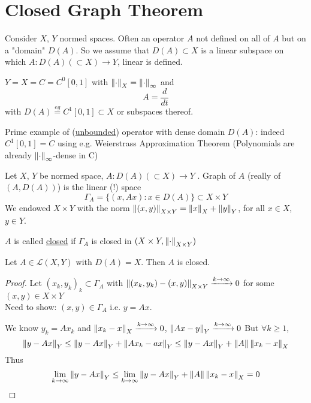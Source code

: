 \documentclass{article}
\begin{document}
\section{Closed Graph Theorem}
Consider $X$, $Y$ normed spaces. Often an operator $A$ not defined on all of $A$ but on a "domain" $D(A)$. So we assume that 
$D(A)\subset X$ is a linear subspace on which $A:D(A)(\subset X)\to Y$, linear is defined.
\begin{example}\nl
$Y=X=C=C^0[0,1]$ with $\left\|{\cdot}\right\|_X=\left\|{\cdot}\right\|_\infty$ and 
$$A=\frac{d}{dt}$$
with $D(A)\stackrel{eg}{=}C^1[0,1]\subset X$ or subspaces thereof. 

Prime example of  (\underline{unbounded}) operator with dense domain $D(A)$: indeed $C^1[0,1]=C$ using e.g. Weierstrass Approximation Theorem (Polynomials are already $\left\|{\cdot}\right\|_\infty$-dense in C)
\end{example}
\begin{definition}\nl
Let $X$, $Y$ be normed space, $A:D(A)(\subset X)\to Y$ . Graph of $A$ (really  of $(A,D(A))$) is the linear (!) space 
$$
\Gamma_A=\{(x,Ax):x\in D(A)\}\subset X\times Y
$$
We endowed $X\times Y$ with the norm $\left\|{(x,y)}\right\|_{X\times Y}=\left\|{x}\right\|_X+\left\|{y}\right\|_Y$, for all $x\in X$, $y\in Y$.
    
\end{definition}
\begin{definition}
$A$ is called \underline{closed} if $\Gamma_A$ is closed in  $(X\times Y,\left\|{\cdot}\right\|_{X\times Y})$
\end{definition}

\begin{example}
Let $A\in\mathcal{L}(X,Y)$ with $D(A)=X$. Then $A$ is closed.
\end{example}
\begin{proof}
	Let $(x_k,y_k)_k\subset \Gamma_A$  with $\left\|{(x_k,y_k)-(x,y)}\right\|_{X\times Y}\xrightarrow{k\to\infty}0$ for some $(x,y)\in X\times Y$\\
	Need to show: $(x,y)\in \Gamma_A$ i.e. $y=Ax$.   
 
	We know $ y_k=Ax_k$ and $\left\|{x_k-x}\right\|_X\xrightarrow{k\to\infty}0$, $\left\|{Ax-y}\right\|_Y\xrightarrow{k\to\infty}0$
	But $\forall k\geq 1$,
	$$\left\|{y-Ax}\right\|_Y\leq\left\|{y-Ax}\right\|_Y+\left\|{Ax_k-ax}\right\|_Y
	\leq \left\|{y-Ax}\right\|_Y+\left\|{A}\right\|\left\|{x_k-x}\right\|_X$$
	Thus 
	$$\lim_{k\to\infty}\left\|{y-Ax}\right\|_Y\leq\lim_{k\to\infty}\left\|{y-Ax}\right\|_Y+\left\|{A}\right\|\left\|{x_k-x}\right\|_X=0$$
\end{proof}
\end{document}
